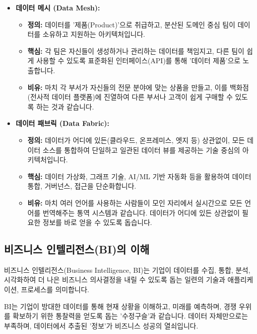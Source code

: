 \documentclass[11pt,a4paper]{article}
\begin{document}
\begin{itemize}
    \item \textbf{데이터 메시 (Data Mesh):}
    \begin{itemize}
        \item \textbf{정의:} 데이터를 '제품(Product)'으로 취급하고, 분산된 도메인 중심 팀이 데이터를 소유하고 지원하는 아키텍처입니다.
        \item \textbf{핵심:} 각 팀은 자신들이 생성하거나 관리하는 데이터를 책임지고, 다른 팀이 쉽게 사용할 수 있도록 표준화된 인터페이스(API)를 통해 '데이터 제품'으로 노출합니다.
        \item \textbf{비유:} 마치 각 부서가 자신들의 전문 분야에 맞는 상품을 만들고, 이를 백화점(전사적 데이터 플랫폼)에 진열하여 다른 부서나 고객이 쉽게 구매할 수 있도록 하는 것과 같습니다.
    \end{itemize}
    \item \textbf{데이터 패브릭 (Data Fabric):}
    \begin{itemize}
        \item \textbf{정의:} 데이터가 어디에 있든(클라우드, 온프레미스, 엣지 등) 상관없이, 모든 데이터 소스를 통합하여 단일하고 일관된 데이터 뷰를 제공하는 기술 중심의 아키텍처입니다.
        \item \textbf{핵심:} 데이터 가상화, 그래프 기술, AI/ML 기반 자동화 등을 활용하여 데이터 통합, 거버넌스, 접근을 단순화합니다.
        \item \textbf{비유:} 마치 여러 언어를 사용하는 사람들이 모인 자리에서 실시간으로 모든 언어를 번역해주는 통역 시스템과 같습니다. 데이터가 어디에 있든 상관없이 필요한 정보를 바로 얻을 수 있도록 돕습니다.
    \end{itemize}
\end{itemize}

\subsection{비즈니스 인텔리전스(BI)의 이해}
비즈니스 인텔리전스(Business Intelligence, BI)는 기업이 데이터를 수집, 통합, 분석, 시각화하여 더 나은 비즈니스 의사결정을 내릴 수 있도록 돕는 일련의 기술과 애플리케이션, 프로세스를 의미합니다.

\begin{tcolorbox}[mybox={핵심 요약: 미래를 보는 수정구슬}]
BI는 기업이 방대한 데이터를 통해 현재 상황을 이해하고, 미래를 예측하며, 경쟁 우위를 확보하기 위한 통찰력을 얻도록 돕는 '수정구슬'과 같습니다. 데이터 자체만으로는 부족하며, 데이터에서 추출된 '정보'가 비즈니스 성공의 열쇠입니다.
\end{tcolorbox}
\end{document}
